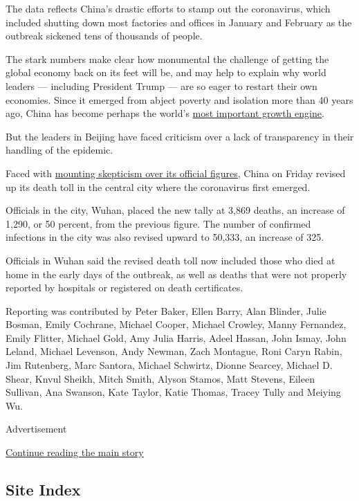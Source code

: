 The data reflects China's drastic efforts to stamp out the coronavirus,
which included shutting down most factories and offices in January and
February as the outbreak sickened tens of thousands of people.

The stark numbers make clear how monumental the challenge of getting the
global economy back on its feet will be, and may help to explain why
world leaders --- including President Trump --- are so eager to restart
their own economies. Since it emerged from abject poverty and isolation
more than 40 years ago, China has become perhaps the world's
\href{https://www.nytimes3xbfgragh.onion/2020/03/02/business/economy/china-coronavirus-economy.html}{most
important growth engine}.

But the leaders in Beijing have faced criticism over a lack of
transparency in their handling of the epidemic.

Faced with
\href{https://www.nytimes3xbfgragh.onion/2020/04/02/us/politics/cia-coronavirus-china.html}{mounting
skepticism over its official figures}, China on Friday revised up its
death toll in the central city where the coronavirus first emerged.

Officials in the city, Wuhan, placed the new tally at 3,869 deaths, an
increase of 1,290, or 50 percent, from the previous figure. The number
of confirmed infections in the city was also revised upward to 50,333,
an increase of 325.

Officials in Wuhan said the revised death toll now included those who
died at home in the early days of the outbreak, as well as deaths that
were not properly reported by hospitals or registered on death
certificates.

Reporting was contributed by Peter Baker, Ellen Barry, Alan Blinder,
Julie Bosman, Emily Cochrane, Michael Cooper, Michael Crowley, Manny
Fernandez, Emily Flitter, Michael Gold, Amy Julia Harris, Adeel Hassan,
John Ismay, John Leland, Michael Levenson, Andy Newman, Zach Montague,
Roni Caryn Rabin, Jim Rutenberg, Marc Santora, Michael Schwirtz, Dionne
Searcey, Michael D. Shear, Knvul Sheikh, Mitch Smith, Alyson Stamos,
Matt Stevens, Eileen Sullivan, Ana Swanson, Kate Taylor, Katie Thomas,
Tracey Tully and Meiying Wu.

Advertisement

\protect\hyperlink{after-bottom}{Continue reading the main story}

\hypertarget{site-index}{%
\subsection{Site Index}\label{site-index}}

